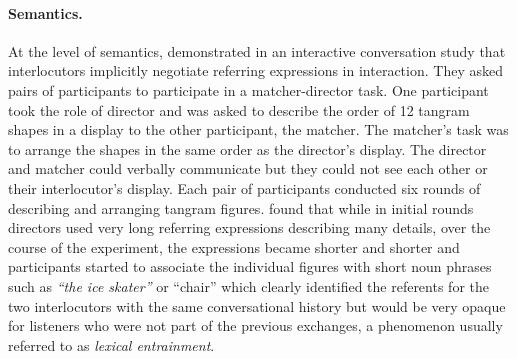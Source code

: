 \paragraph{Semantics.} At the level of semantics, \cite{ClarkWilkesGibbs1986} demonstrated in an interactive conversation study that interlocutors 
implicitly negotiate referring expressions in interaction. They asked pairs of participants to participate in a matcher-director task. One participant
took the role of director and was asked to describe the order of 12 tangram shapes in a display to the other participant, the matcher. The matcher's task was
to arrange the shapes in the same order as the director's display. The director and matcher could verbally communicate but they could not see each other or 
their interlocutor's display. Each pair of participants conducted six rounds of describing and arranging tangram figures. \cite{ClarkWilkesGibbs1986} found that 
while in initial rounds directors used very long referring expressions describing many details, over the course of the experiment, the expressions became shorter and
shorter and participants started to associate the individual figures with short noun phrases such as \textit{``the ice skater''} or ``chair'' which clearly identified 
the referents for the two interlocutors with the same conversational history but would be very opaque for listeners who were not part of the previous exchanges, a
phenomenon usually referred to as \textit{lexical entrainment}. 

